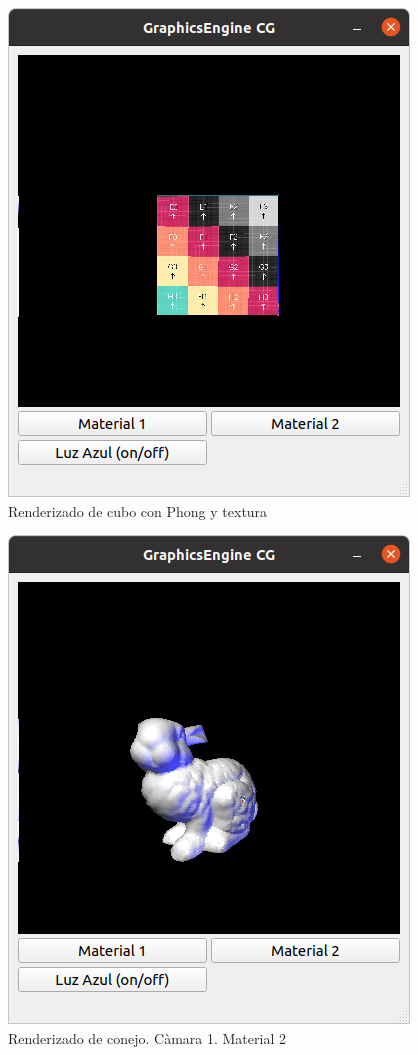 \documentclass[12pt]{article}
\begin{document}
\begin{figure}[H]
\includegraphics[scale=0.5]{images/ej3.png}
\caption{Renderizado de cubo con Phong y textura}
\end{figure}


\begin{figure}[H]
\centering
\includegraphics[scale=0.5]{images/ej4.png}
\caption{Renderizado de conejo. Càmara 1. Material 2}
\end{figure}
\end{document}
